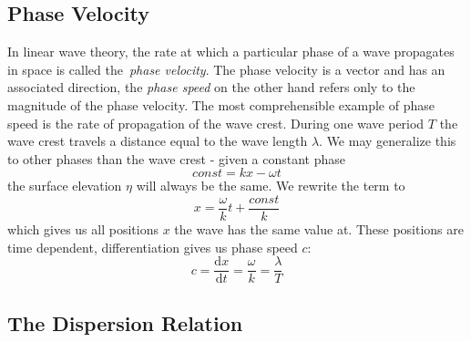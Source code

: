 \subsection{Phase Velocity}
\label{sec:phase_velocity}
In linear wave theory, the rate at which a particular phase of a wave propagates in space is called
the~\emph{phase velocity}. The phase velocity is a vector and has an associated direction,
the \emph{phase speed} on the other hand refers only to the magnitude of the phase velocity.
The most comprehensible example of phase speed is the rate of propagation of the wave crest.
During one wave period $T$ the wave crest travels a distance equal to the wave length $\lambda$.
We may generalize this to other phases than the wave crest - given a constant phase
\begin{equation}
  const = kx - \omega t
\end{equation}
the surface elevation $\eta$ will always be the same. We rewrite the term to
\begin{equation}
  x = \frac{\omega}{k}t + \frac{const}{k}
\end{equation}
which gives us all positions $x$ the wave has the same value at. These positions are time dependent,
differentiation gives us phase speed $c$:
\begin{equation}
  c = \frac{\mathrm dx}{\mathrm dt} = \frac{\omega}{k} = \frac{\lambda}{T}
\end{equation}

\subsection{The Dispersion Relation}
\label{sec:dispersion_relation}

